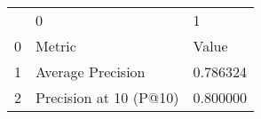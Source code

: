 \begin{tabular}{lll}
 & 0 & 1 \\
0 & Metric & Value \\
1 & Average Precision & 0.786324 \\
2 & Precision at 10 (P@10) & 0.800000 \\
\end{tabular}
